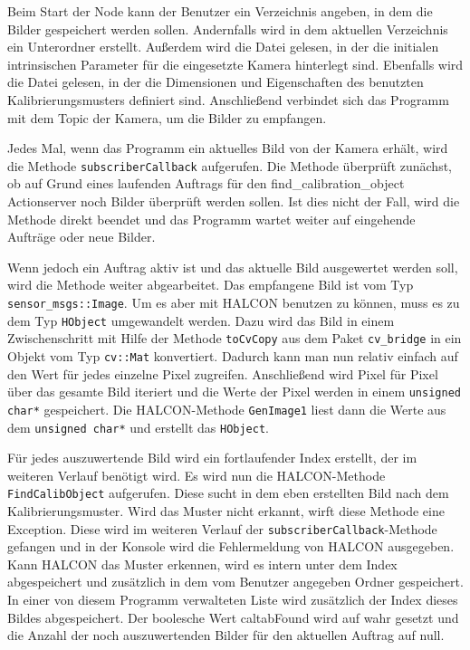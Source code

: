 Beim Start der Node kann der Benutzer ein Verzeichnis angeben, in dem die Bilder gespeichert werden sollen. Andernfalls wird in dem aktuellen Verzeichnis ein Unterordner erstellt. Außerdem wird die Datei gelesen, in der die initialen intrinsischen Parameter für die eingesetzte Kamera hinterlegt sind. Ebenfalls wird die Datei gelesen, in der die Dimensionen und Eigenschaften des benutzten Kalibrierungsmusters definiert sind. Anschließend verbindet sich das Programm mit dem Topic der Kamera, um die Bilder zu empfangen.

Jedes Mal, wenn das Programm ein aktuelles Bild von der Kamera erhält, wird die Methode \texttt{subscriberCallback} aufgerufen. Die Methode überprüft zunächst, ob auf Grund eines laufenden Auftrags für den find\_calibration\_object Actionserver noch Bilder überprüft werden sollen. Ist dies nicht der Fall, wird die Methode direkt beendet und das Programm wartet weiter auf eingehende Aufträge oder neue Bilder. 

Wenn jedoch ein Auftrag aktiv ist und das aktuelle Bild ausgewertet werden soll, wird die Methode weiter abgearbeitet. Das empfangene Bild ist vom Typ \texttt{sensor\_msgs::Image}. Um es aber mit HALCON benutzen zu können, muss es zu dem Typ \texttt{HObject} umgewandelt werden. Dazu wird das Bild in einem Zwischenschritt mit Hilfe der Methode \texttt{toCvCopy} aus dem Paket \texttt{cv\_bridge} in ein Objekt vom Typ \texttt{cv::Mat} konvertiert. Dadurch kann man nun relativ einfach auf den Wert für jedes einzelne Pixel zugreifen. Anschließend wird Pixel für Pixel über das gesamte Bild iteriert und die Werte der Pixel werden in einem \texttt{unsigned char*} gespeichert. Die HALCON-Methode \texttt{GenImage1} liest dann die Werte aus dem \texttt{unsigned char*} und erstellt das \texttt{HObject}.

Für jedes auszuwertende Bild wird ein fortlaufender Index erstellt, der im weiteren Verlauf benötigt wird. Es wird nun die HALCON-Methode \texttt{FindCalibObject} aufgerufen. Diese sucht in dem eben erstellten Bild nach dem Kalibrierungsmuster. Wird das Muster nicht erkannt, wirft diese Methode eine Exception. Diese wird im weiteren Verlauf der \texttt{subscriberCallback}-Methode gefangen und in der Konsole wird die Fehlermeldung von HALCON ausgegeben. Kann HALCON das Muster erkennen, wird es intern unter dem Index abgespeichert und zusätzlich in dem vom Benutzer angegeben Ordner gespeichert. In einer von diesem Programm verwalteten Liste wird zusätzlich der Index dieses Bildes abgespeichert. Der boolesche Wert caltabFound wird auf wahr gesetzt und die Anzahl der noch auszuwertenden Bilder für den aktuellen Auftrag auf null. 

